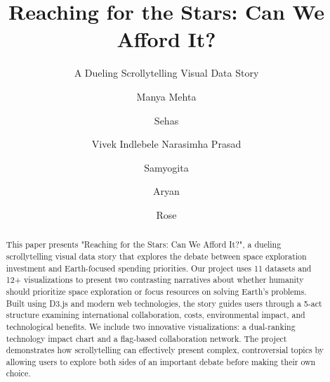 \documentclass[sigconf]{acmart}
\begin{document}
\makeatletter
\def\acmConference@shortname{}
\def\acmConference@date{} 
\def\acmConference@venue{}
\makeatother

\title{Reaching for the Stars: Can We Afford It?}
\subtitle{A Dueling Scrollytelling Visual Data Story}

\author{Manya Mehta}

\author{Sehas}

\author{Vivek Indlebele Narasimha Prasad}

\author{Samyogita}

\author{Aryan}

\author{Rose}

\renewcommand{\shortauthors}{Manya et al.}

\begin{abstract}
  This paper presents "Reaching for the Stars: Can We Afford It?", a dueling scrollytelling visual data story that explores the debate between space exploration investment and Earth-focused spending priorities. Our project uses 11 datasets and 12+ visualizations to present two contrasting narratives about whether humanity should prioritize space exploration or focus resources on solving Earth's problems. Built using D3.js and modern web technologies, the story guides users through a 5-act structure examining international collaboration, costs, environmental impact, and technological benefits. We include two innovative visualizations: a dual-ranking technology impact chart and a flag-based collaboration network. The project demonstrates how scrollytelling can effectively present complex, controversial topics by allowing users to explore both sides of an important debate before making their own choice.
\end{abstract}
\end{document}
